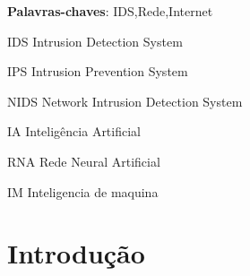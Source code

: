 \documentclass[
	12pt,				%
	openright,			%
	oneside,
	a4paper,			%
	english,			%
	french,				%
	spanish,			%
	brazil				%
	]{abntex2}
\begin{document}
\frenchspacing 


\imprimircapa

\imprimirfolhaderosto%


\setlength{\absparsep}{18pt} %
\begin{resumo}
   
 \textbf{Palavras-chaves}: IDS,Rede,Internet
\end{resumo}

\listoffigures*
\cleardoublepage

\listoftables*
\cleardoublepage

\begin{siglas}
  \item[IDS] Intrusion Detection System
  \item[IPS] Intrusion Prevention System
  \item[NIDS] Network Intrusion Detection System
  \item[IA] Inteligência Artificial
  \item[RNA] Rede Neural Artificial
  \item[IM] Inteligencia de maquina	
\end{siglas}

\tableofcontents*
\cleardoublepage

\textual

\chapter[Introdução]{Introdução}
\end{document}
